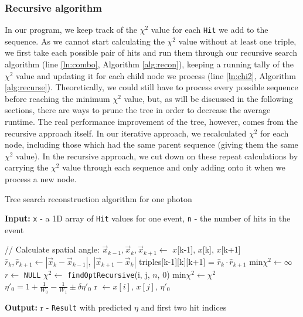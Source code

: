 \subsubsection{Recursive algorithm}
In our program, we keep track of the $\chi^2$ value for each \texttt{Hit} we add to the sequence. As we cannot start calculating the $\chi^2$ value without at least one triple, we first take each possible pair of hits and run them through our recursive search algorithm (line \ref{ln:combo}, Algorithm \ref{alg:recon}), keeping a running tally of the $\chi^2$ value and updating it for each child node we process (line \ref{ln:chi2}, Algorithm \ref{alg:recurse}). Theoretically, we could still have to process every possible sequence before reaching the minimum $\chi^2$ value, but, as will be discussed in the following sections, there are ways to prune the tree in order to decrease the average runtime. The real performance improvement of the tree, however, comes from the recursive approach itself. In our iterative approach, we recalculated $\chi^2$ for each node, including those which had the same parent sequence (giving them the same $\chi^2$ value). In the recursive approach, we cut down on these repeat calculations by carrying the $\chi^2$ value through each sequence and only adding onto it when we process a new node. 

\begin{algorithm}
\caption{Tree search reconstruction algorithm for one photon}\label{alg:recon}
\hspace{\algorithmicindent} \textbf{Input:} \texttt{x} - a 1D array of \texttt{Hit} values for one event, \texttt{n} - the number of hits in the event
\begin{algorithmic}[1]
     \label{ln:precompute} 
        \State // Calculate spatial angle:
        \State $\vec{x}_{k-1}, \vec{x}_k, \vec{x}_{k+1} \gets$ $x$[k-1], $x$[k], $x$[k+1] 
        \State $\hat{r}_k, \hat{r}_{k+1} \gets |\vec{x}_{k} - \vec{x}_{k-1}|$, $|\vec{x}_{k+1}-\vec{x}_{k}|$ 
        \State triples[k-1][k][k+1] = $\hat{r}_k\cdot\hat{r}_{k+1}$ 
    \EndFor
    \State
    \State min$\chi^2 \gets \infty$
    \State $r \gets$ \texttt{NULL} 
    \State
     \label{ln:combo} 
        \State $\chi^2 \gets$ \texttt{findOptRecursive}(i, j, $n$, 0) 
        \State
         
        \State min$\chi^2 \gets \chi^2$
        \State $\eta'_0 = 1 + \frac{1}{W_0}-\frac{1}{W_1} \pm \delta\eta'_0$ 
        \State r $\gets x[i]$, $x[j]$, $\eta'_0$ 
        \EndIf
    \EndFor
\end{algorithmic}
\hspace{\algorithmicindent} \textbf{Output:} r - \texttt{Result} with predicted $\eta$ and first two hit indices
\end{algorithm}

